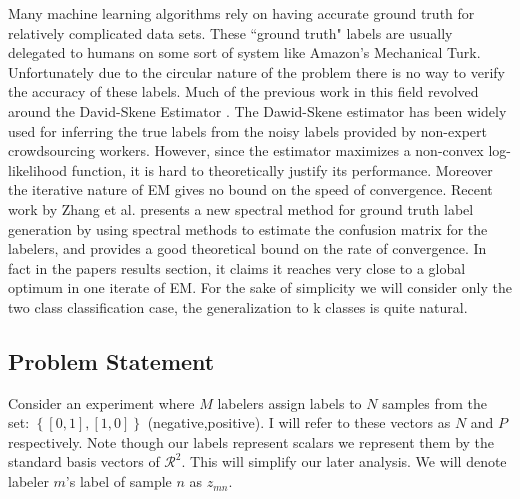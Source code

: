     Many machine learning algorithms rely on having accurate ground truth for relatively complicated data sets. These ``ground truth" labels are usually delegated to humans on some sort of system like Amazon's Mechanical Turk. Unfortunately due to the circular nature of the problem there is no way to verify the accuracy of these labels. Much of the previous work in this field revolved around the David-Skene Estimator \cite{dawid1979maximum}. The Dawid-Skene estimator has been widely used for inferring the true labels from the noisy labels provided by non-expert crowdsourcing workers. However, since the estimator maximizes a non-convex log-likelihood function, it is hard to theoretically justify its performance. Moreover the iterative nature of EM gives no bound on the speed of convergence.  Recent work by Zhang et al. \cite{zhang2014spectral} presents a new spectral method for ground truth label generation by using spectral methods to estimate the confusion matrix for the labelers, and provides a good theoretical bound on the rate of convergence. In fact in the papers results section, it claims it reaches very close to a global optimum in one iterate of EM. For the sake of simplicity we will consider only the two class classification case, the generalization to k classes is quite natural.

\subsection{Problem Statement}
Consider an experiment where $M$ labelers assign labels to $N$ samples from the set: $\left\{[0,1],[1,0]\right\}$ (negative,positive). I will refer to these vectors as $N$ and $P$ respectively. Note though our labels represent scalars we represent them by the standard basis vectors of $\mathcal{R}^{2}$. This will simplify our later analysis. We will denote labeler $m$'s label of sample $n$ as $z_{mn}$. 


